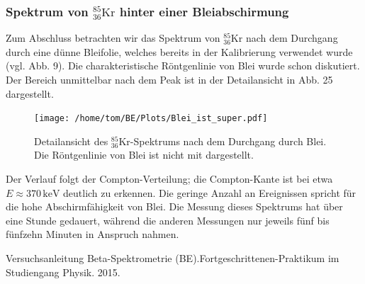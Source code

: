 \documentclass[german,  %
parskip=full,  %
]{scrartcl}
\begin{document}
\subsubsection{Spektrum von \(^{85}_{36}\mathrm{Kr}\) hinter einer Bleiabschirmung}
Zum Abschluss betrachten wir das Spektrum von \(^{85}_{36}\mathrm{Kr}\) nach dem Durchgang durch eine dünne Bleifolie, welches bereits in der Kalibrierung verwendet wurde (vgl. Abb. 9). Die charakteristische Röntgenlinie von Blei wurde schon diskutiert. Der Bereich unmittelbar nach dem Peak ist in der Detailansicht in Abb. 25 dargestellt. 
\newpage
\begin{figure}[h!]\centering
\texttt{[image: /home/tom/BE/Plots/Blei\_ist\_super.pdf]}
\caption{Detailansicht des \(^{85}_{36}\mathrm{Kr}\)-Spektrums nach dem Durchgang durch Blei. Die Röntgenlinie von Blei ist nicht mit dargestellt.}
\end{figure} 
Der Verlauf folgt der Compton-Verteilung; die Compton-Kante ist bei etwa \(E\approx 370\,\mathrm{keV}\) deutlich zu erkennen. Die geringe Anzahl an Ereignissen spricht für die hohe Abschirmfähigkeit von Blei. Die Messung dieses Spektrums hat über eine Stunde gedauert, während die anderen Messungen nur jeweils fünf bis fünfzehn Minuten in Anspruch nahmen.
    \begin{thebibliography}{9}

    Versuchsanleitung Beta-Spektrometrie (BE).Fortgeschrittenen-Praktikum im Studiengang Physik. 2015.
\end{thebibliography}
\end{document}
